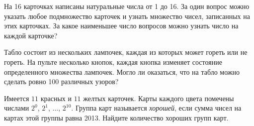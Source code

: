 \begin{problems}
\item 
На 16 карточках написаны натуральные числа от 1 до 16.
За один вопрос можно указать любое подмножество карточек и узнать множество
чисел, записанных на этих карточках.
За какое наименьшее число вопросов можно узнать число на каждой
карточке?

\item 
Табло состоит из нескольких лампочек, каждая из которых может гореть или не
гореть.
На пульте несколько кнопок, каждая кнопка изменяет состояние определенного
множества лампочек.
Могло ли оказаться, что на табло можно сделать ровно 100 различных узоров?

\item 
Имеется $11$ красных и $11$ желтых карточек.
Карты каждого цвета помечены числами $2^0$, $2^1$, $\ldots$, $2^{10}$.
Группа карт называется \emph{хорошей}, если сумма чисел на картах этой
группы равна 2013.
Найдите количество хороших групп карт.

\end{problems}

